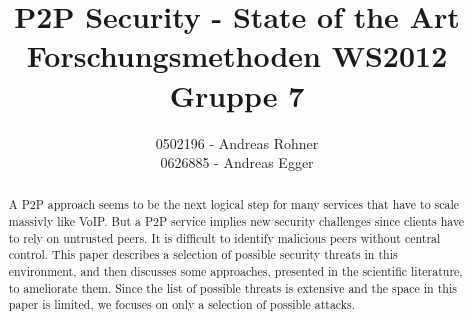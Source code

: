 \documentclass[a4paper,conference]{IEEEtran}
\begin{document}
%
\title{P2P Security - State of the Art\\
Forschungsmethoden WS2012\\
Gruppe 7}

\author{0502196 - Andreas Rohner\\
0626885 - Andreas Egger
}


%








\maketitle

\begin{abstract}
A P2P approach seems to be the next logical step for many services that have to
scale massivly like VoIP. But a P2P service implies new security challenges
since clients have to rely on untrusted peers. It is difficult to identify
malicious peers without central control. This paper describes a selection of
possible security threats in this
environment, and then discusses some approaches, presented in the scientific
literature, to ameliorate them. Since the list of possible threats is extensive and the space in this paper is limited,
we focuses on only a selection of possible attacks.
\end{abstract}
\end{document}
